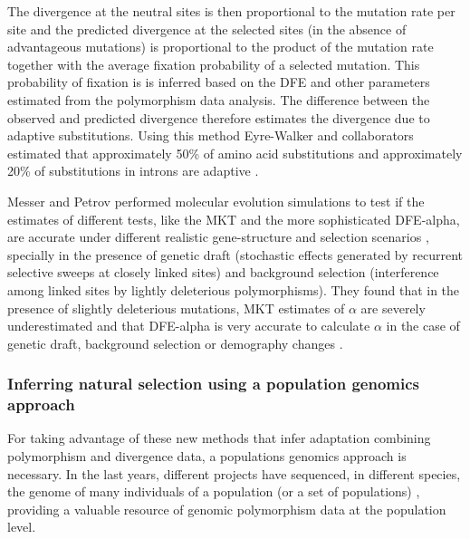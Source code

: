 The divergence at the neutral sites is then proportional to the mutation rate per site and the predicted divergence at the selected sites (in the absence of advantageous mutations) is proportional to the product of the mutation rate together with the average fixation probability of a selected mutation.
This probability of fixation is is inferred based on the DFE and other parameters estimated from the polymorphism data analysis\citep{Eyre-Walker2009}.
The difference between the observed and predicted divergence therefore estimates the divergence due to adaptive substitutions.
%
Using this method Eyre-Walker and collaborators estimated that approximately 50\% of amino acid substitutions and approximately 20\% of substitutions in introns are adaptive \citep{Eyre-Walker2009}.

Messer and Petrov performed molecular evolution simulations to test if the estimates of different tests, like the MKT and the more sophisticated DFE-alpha, are accurate under different realistic gene-structure and selection scenarios \citep{Messer2013}, specially in the presence of genetic draft (stochastic effects generated by recurrent selective sweeps at closely linked sites)
and background selection (interference among linked sites by lightly deleterious polymorphisms).
%
They found that in the presence of slightly deleterious mutations, MKT estimates of $\alpha$ are severely underestimated and that DFE-alpha is very accurate to calculate $\alpha$ in the case of genetic draft, background selection or demography changes \citep{Messer2013}.
%

\subsubsection{Inferring natural selection using a population genomics approach}

For taking advantage of these new methods that infer adaptation combining polymorphism and divergence data, a populations genomics approach is necessary. 
In the last years, different projects have sequenced, in different species, the genome of many individuals of a population (or a set of populations) \citep{The1000GenomesProjectConsortium2010,Mackay2012,Pool2012,Wallberg2014}, providing a valuable resource of genomic polymorphism data at the population level.

